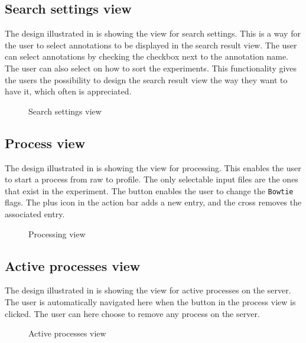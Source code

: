 \subsection{Search settings view}
The design illustrated in  is showing the view for search settings. 
This is a way for the user to select annotations to be displayed in the search result view.
The user can select annotations by checking the checkbox next to the annotation name.
The user can also select on how to sort the experiments.
This functionality gives the users the possibility to design the search result view the way they want to have it, which often is appreciated. 

\begin{figure}[ht]
\caption{\footnotesize Search settings view}
\label{fig:and_search_settings}
\end{figure}
\FloatBarrier

\subsection{Process view}
The design illustrated in  is showing the view for processing. 
This enables the user to start a process from raw to profile. The only selectable input files are the ones that exist in the experiment.
The  button enables the user to change the \verb!Bowtie! flags.
The plus icon in the action bar adds a new entry, and the cross removes the associated entry.

\begin{figure}[ht]
\caption{\footnotesize Processing view}
\label{fig:and_processing_view}
\end{figure}
\FloatBarrier

\subsection{Active processes view}
The design illustrated in  is showing the view for active processes on the server. 
The user is automatically navigated here when the  button in the process view is clicked.
The user can here choose to remove any process on the server.

\begin{figure}[ht]
\caption{\footnotesize Active processes view}
\label{fig:and_active_processes_view}
\end{figure}
\FloatBarrier
